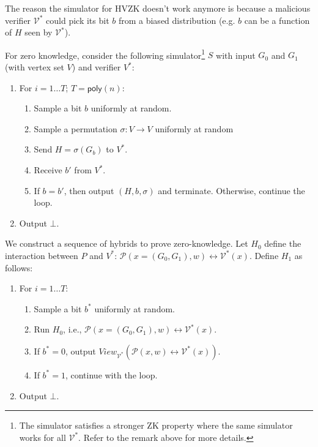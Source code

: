 The reason the simulator for HVZK doesn't work anymore is because a malicious verifier $\mathcal{V^*}$ could pick its bit $b$ from a biased distribution (e.g. $b$ can be a function of $H$ seen by $\mathcal{V^*}$).

For zero knowledge, consider the following simulator\footnote{The simulator satisfies a stronger ZK property where the same simulator works for all $\mathcal{V^*}$. Refer to the remark above for more details.} $S$ with input $G_0$ and $G_1$ (with vertex set $V$) and verifier $V^*$:

\begin{enumerate}
\item For $i = 1\dots T$; $T=\mathsf{poly}(n)$:
\begin{enumerate}
	\item Sample a bit $b$ uniformly at random.

	\item Sample a permutation $\sigma: V \to V$ uniformly at random
	
	\item Send $H = \sigma (G_b)$ to $V^*$.

	\item Receive $b'$ from $V^*$.

	\item If $b=b'$, then output $(H, b, \sigma)$ and terminate. Otherwise, continue the loop.
\end{enumerate}
\item Output $\bot$.

\end{enumerate}

We construct a sequence of hybrids to prove zero-knowledge. Let $H_0$ define the interaction between $P$ and $V^*$: $\mathcal{P}(x=(G_0, G_1), w)\leftrightarrow \mathcal{V^*}(x)$. Define $H_1$ as follows: 
\begin{enumerate}
	\item For $i = 1\dots T$:
\begin{enumerate}
	\item Sample a bit $b^*$ uniformly at random.

	\item Run $H_0$, i.e., $\mathcal{P}(x=(G_0, G_1), w)\leftrightarrow \mathcal{V^*}(x)$.
	
	\item If $b^*=0$, output $View_{\mathcal{V^*}}(\mathcal{P}(x,w) \leftrightarrow \mathcal{V^*}(x))$.
	
	\item If $b^*=1$, continue with the loop.
\end{enumerate}
\item Output $\bot$.
\end{enumerate}

